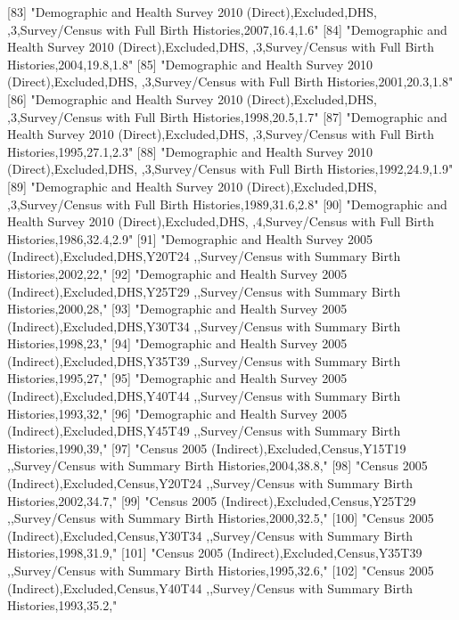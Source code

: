  [83] "Demographic and Health Survey 2010 (Direct),Excluded,DHS, ,3,Survey/Census with Full Birth Histories,2007,16.4,1.6"           
 [84] "Demographic and Health Survey 2010 (Direct),Excluded,DHS, ,3,Survey/Census with Full Birth Histories,2004,19.8,1.8"           
 [85] "Demographic and Health Survey 2010 (Direct),Excluded,DHS, ,3,Survey/Census with Full Birth Histories,2001,20.3,1.8"           
 [86] "Demographic and Health Survey 2010 (Direct),Excluded,DHS, ,3,Survey/Census with Full Birth Histories,1998,20.5,1.7"           
 [87] "Demographic and Health Survey 2010 (Direct),Excluded,DHS, ,3,Survey/Census with Full Birth Histories,1995,27.1,2.3"           
 [88] "Demographic and Health Survey 2010 (Direct),Excluded,DHS, ,3,Survey/Census with Full Birth Histories,1992,24.9,1.9"           
 [89] "Demographic and Health Survey 2010 (Direct),Excluded,DHS, ,3,Survey/Census with Full Birth Histories,1989,31.6,2.8"           
 [90] "Demographic and Health Survey 2010 (Direct),Excluded,DHS, ,4,Survey/Census with Full Birth Histories,1986,32.4,2.9"           
 [91] "Demographic and Health Survey 2005 (Indirect),Excluded,DHS,Y20T24 ,,Survey/Census with Summary Birth Histories,2002,22,"      
 [92] "Demographic and Health Survey 2005 (Indirect),Excluded,DHS,Y25T29 ,,Survey/Census with Summary Birth Histories,2000,28,"      
 [93] "Demographic and Health Survey 2005 (Indirect),Excluded,DHS,Y30T34 ,,Survey/Census with Summary Birth Histories,1998,23,"      
 [94] "Demographic and Health Survey 2005 (Indirect),Excluded,DHS,Y35T39 ,,Survey/Census with Summary Birth Histories,1995,27,"      
 [95] "Demographic and Health Survey 2005 (Indirect),Excluded,DHS,Y40T44 ,,Survey/Census with Summary Birth Histories,1993,32,"      
 [96] "Demographic and Health Survey 2005 (Indirect),Excluded,DHS,Y45T49 ,,Survey/Census with Summary Birth Histories,1990,39,"      
 [97] "Census 2005 (Indirect),Excluded,Census,Y15T19 ,,Survey/Census with Summary Birth Histories,2004,38.8,"                        
 [98] "Census 2005 (Indirect),Excluded,Census,Y20T24 ,,Survey/Census with Summary Birth Histories,2002,34.7,"                        
 [99] "Census 2005 (Indirect),Excluded,Census,Y25T29 ,,Survey/Census with Summary Birth Histories,2000,32.5,"                        
[100] "Census 2005 (Indirect),Excluded,Census,Y30T34 ,,Survey/Census with Summary Birth Histories,1998,31.9,"                        
[101] "Census 2005 (Indirect),Excluded,Census,Y35T39 ,,Survey/Census with Summary Birth Histories,1995,32.6,"                        
[102] "Census 2005 (Indirect),Excluded,Census,Y40T44 ,,Survey/Census with Summary Birth Histories,1993,35.2,"                        
